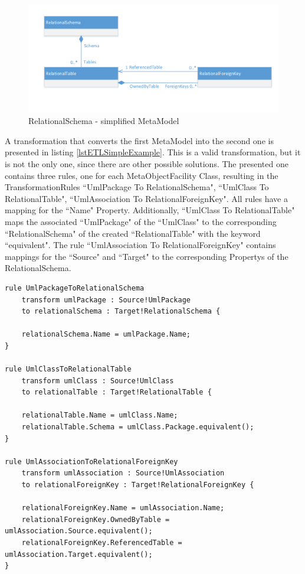 \begin{figure}[htb]
	\centering
	\includegraphics[scale=0.6, trim=0cm 1cm 0cm 1cm, clip=true]{Images/ScenarioStructuralSimpleRelationalMetaModel.pdf} 
	\caption{\Gls{RelationalSchema} - simplified \gls{MetaModel}}
	\label{figScenarioStructuralSimpleRelationalMetaModel}
\end{figure}

A transformation that converts the first \gls{MetaModel} into the second one is presented in listing \ref{lstETLSimpleExample}. This is a valid transformation, but it is not the only one, since there are other possible solutions. The presented one contains three rules, one for each \gls{MetaObjectFacility} \gls{Class}, resulting in the \glspl{TransformationRule} ``UmlPackage To RelationalSchema", ``UmlClass To RelationalTable", ``UmlAssociation To RelationalForeignKey". All rules have a mapping for the ``Name" \gls{Property}. Additionally, ``UmlClass To RelationalTable" maps the associated ``UmlPackage" of the ``UmlClass" to the corresponding ``RelationalSchema" of the created ``RelationalTable" with the keyword ``equivalent". The rule ``UmlAssociation To RelationalForeignKey" contains mappings for the ``Source" and ``Target" to the corresponding \glspl{Property} of the \gls{RelationalSchema}.

\begin{lstlisting}[language=ETL,caption={Simple \gls{UnifiedModelingLanguage} \gls{ClassDiagram} to simple \gls{RelationalSchema} \gls{ModelToModelTransformation} in \gls{ConcreteSyntax} of \gls{EpsilonTransformationLanguage}},label={lstETLSimpleExample}]
rule UmlPackageToRelationalSchema
  	transform umlPackage : Source!UmlPackage
  	to relationalSchema : Target!RelationalSchema {
  
  	relationalSchema.Name = umlPackage.Name; 
}

rule UmlClassToRelationalTable 
	transform umlClass : Source!UmlClass
	to relationalTable : Target!RelationalTable {
	
	relationalTable.Name = umlClass.Name;
	relationalTable.Schema = umlClass.Package.equivalent();
}

rule UmlAssociationToRelationalForeignKey
	transform umlAssociation : Source!UmlAssociation
	to relationalForeignKey : Target!RelationalForeignKey {
	
	relationalForeignKey.Name = umlAssociation.Name;
	relationalForeignKey.OwnedByTable = umlAssociation.Source.equivalent();
	relationalForeignKey.ReferencedTable = umlAssociation.Target.equivalent();	
}
\end{lstlisting}

